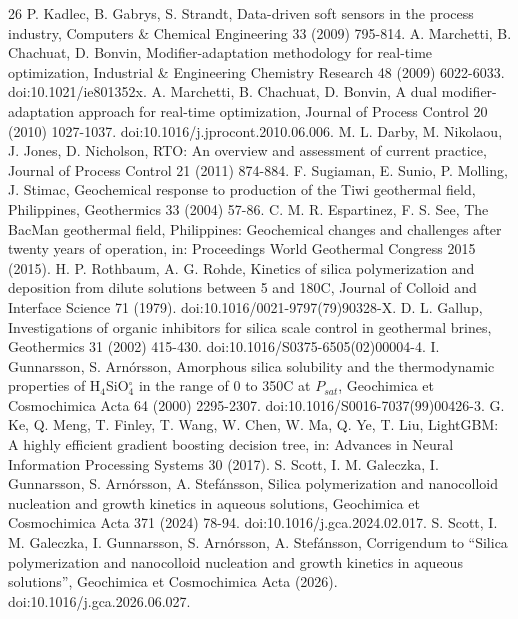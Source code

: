 \documentclass[review,number,sort&compress]{elsarticle}
\begin{document}
\begin{thebibliography}{26}
{{ P. Kadlec, B. Gabrys, S. Strandt, Data-driven soft sensors in the process industry, Computers \& Chemical Engineering 33 (2009) 795-814.
 A. Marchetti, B. Chachuat, D. Bonvin, Modifier-adaptation methodology for real-time optimization, Industrial \& Engineering Chemistry Research 48 (2009) 6022-6033. doi:10.1021/ie801352x.
 A. Marchetti, B. Chachuat, D. Bonvin, A dual modifier-adaptation approach for real-time optimization, Journal of Process Control 20 (2010) 1027-1037. doi:10.1016/j.jprocont.2010.06.006.
 M. L. Darby, M. Nikolaou, J. Jones, D. Nicholson, RTO}: An overview and assessment of current practice, Journal of Process Control 21 (2011) 874-884.
 F. Sugiaman, E. Sunio, P. Molling, J. Stimac, Geochemical response to production of the {Tiwi} geothermal field, {Philippines, Geothermics 33 (2004) 57-86.
 C. M. R. Espartinez, F. S. See, The {BacMan} geothermal field, {Philippines}: Geochemical changes and challenges after twenty years of operation, in: Proceedings World Geothermal Congress 2015 (2015).
 H. P. Rothbaum, A. G. Rohde, Kinetics of silica polymerization and deposition from dilute solutions between 5 and 180{\textdegree}{C, Journal of Colloid and Interface Science 71 (1979). doi:10.1016/0021-9797(79)90328-X.
 D. L. Gallup, Investigations of organic inhibitors for silica scale control in geothermal brines, Geothermics 31 (2002) 415-430. doi:10.1016/S0375-6505(02)00004-4.
 I. Gunnarsson, S. Arn{\'o}rsson, Amorphous silica solubility and the thermodynamic properties of {H$_4$SiO$_4^\circ$} in the range of 0{\textdegree} to 350{\textdegree}C at {$P_{sat}$, Geochimica et Cosmochimica Acta 64 (2000) 2295-2307. doi:10.1016/S0016-7037(99)00426-3.
 G. Ke, Q. Meng, T. Finley, T. Wang, W. Chen, W. Ma, Q. Ye, T. Liu, LightGBM}: A highly efficient gradient boosting decision tree, in: Advances in Neural Information Processing Systems 30 (2017).
 S. Scott, I. M. Galeczka, I. Gunnarsson, S. Arn{\'o}rsson, A. Stef{\'a}nsson, Silica polymerization and nanocolloid nucleation and growth kinetics in aqueous solutions, Geochimica et Cosmochimica Acta 371 (2024) 78-94. doi:10.1016/j.gca.2024.02.017.
 S. Scott, I. M. Galeczka, I. Gunnarsson, S. Arn{\'o}rsson, A. Stef{\'a}nsson, Corrigendum to ``Silica polymerization and nanocolloid nucleation and growth kinetics in aqueous solutions'', Geochimica et Cosmochimica Acta (2026). doi:10.1016/j.gca.2026.06.027.
}}}
\end{thebibliography}
\end{document}
